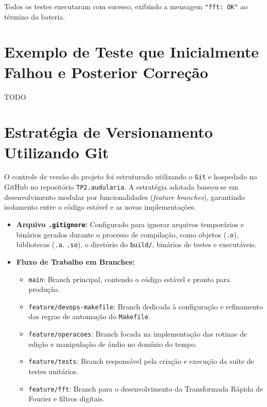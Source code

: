 \documentclass[12pt, a4paper]{article}
\begin{document}
Todos os testes executaram com sucesso, exibindo a mensagem \texttt{"fft: OK"} ao término da bateria.

\section{Exemplo de Teste que Inicialmente Falhou e Posterior Correção}
TODO

\section{Estratégia de Versionamento Utilizando Git}
O controle de versão do projeto foi estruturado utilizando o \texttt{Git} e hospedado no GitHub no repositório \texttt{TP2.audularia}. A estratégia adotada baseou-se em desenvolvimento modular por funcionalidades (\emph{feature branches}), garantindo isolamento entre o código estável e as novas implementações.

\begin{itemize}
    \item \textbf{Arquivo \texttt{.gitignore}:} Configurado para ignorar arquivos temporários e binários gerados durante o processo de compilação, como objetos (\texttt{.o}), bibliotecas (\texttt{.a}, \texttt{.so}), o diretório do \texttt{build/}, binários de testes e executáveis.
    \item \textbf{Fluxo de Trabalho em Branches:}
    \begin{itemize}
        \item \texttt{main}: Branch principal, contendo o código estável e pronto para produção.
        \item \texttt{feature/devops-makefile}: Branch dedicada à configuração e refinamento das regras de automação do \texttt{Makefile}.
        \item \texttt{feature/operacoes}: Branch focada na implementação das rotinas de edição e manipulação de áudio no domínio do tempo.
        \item \texttt{feature/tests}: Branch responsável pela criação e execução da suíte de testes unitários.
        \item \texttt{feature/fft}: Branch para o desenvolvimento da Transformada Rápida de Fourier e filtros digitais.
    \end{itemize}
\end{itemize}
\end{document}
